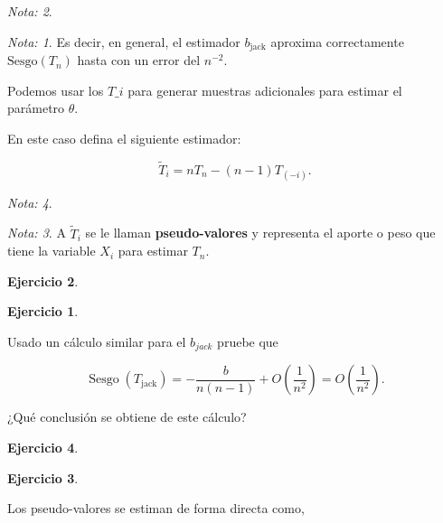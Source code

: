 \documentclass[
  12pt,
]{book}
\theoremstyle{definition}
\theoremstyle{definition}
\theoremstyle{definition}
\newtheorem{exercise}{Ejercicio}[chapter]
\theoremstyle{remark}
\newtheorem*{remark}{Nota: }
\begin{document}
\begin{remark}
\begin{remark}

{}Es decir, en general, el estimador \(b_{\text{jack}}\) aproxima
correctamente \(\mathrm{Sesgo}\left( T_{n} \right)\) hasta con un
error del \(n^{-2}\).

\end{remark}
\end{remark}

Podemos usar los \(T\_i\) para generar muestras adicionales para
estimar el parámetro \(\theta\).

En este caso defina el siguiente estimador:

\[
\widetilde{T}_{i}=n T_{n}-(n-1) T_{(-i)}.
\]

\begin{remark}
\begin{remark}

{}A \(\widetilde{T}_{i}\) se le llaman \textbf{pseudo-valores} y
representa el aporte o peso que tiene la variable \(X_{i}\) para
estimar \(T_{n}\).

\end{remark}
\end{remark}

\begin{exercise}
\begin{exercise}
\protect\hypertarget{exr:unlabeled-div-36}{}\label{exr:unlabeled-div-36}

\protect\hypertarget{exr:unnamed-chunk-75}{}{\label{exr:unnamed-chunk-75} }Usado un cálculo similar para el \(b_{jack}\) pruebe que

\[
\operatorname{Sesgo}\left(T_{\text {jack}
}\right)=-\frac{b}{n(n-1)}+O\left(\frac{1}{n^{2}}\right)=O\left(\frac{1}{n^{2}}\right).
\]

¿Qué conclusión se obtiene de este cálculo?

\end{exercise}
\end{exercise}

\begin{exercise}
\begin{exercise}
\protect\hypertarget{exr:unlabeled-div-37}{}\label{exr:unlabeled-div-37}

\protect\hypertarget{exr:unnamed-chunk-76}{}{\label{exr:unnamed-chunk-76} }Los pseudo-valores se estiman de forma directa como,

\end{exercise}
\end{exercise}
\end{document}
